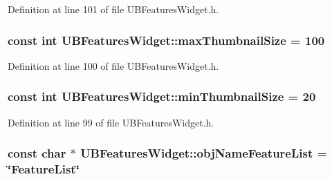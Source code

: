 Definition at line 101 of file U\-B\-Features\-Widget.\-h.

\hypertarget{class_u_b_features_widget_aeaababf494eed37a667f67b4b781014e}{
\subsubsection[{max\-Thumbnail\-Size}]{\setlength{\rightskip}{0pt plus 5cm}const int U\-B\-Features\-Widget\-::max\-Thumbnail\-Size = 100\hspace{0.3cm}{\ttfamily [static]}}}\label{d5/d85/class_u_b_features_widget_aeaababf494eed37a667f67b4b781014e}


Definition at line 100 of file U\-B\-Features\-Widget.\-h.

\hypertarget{class_u_b_features_widget_aea292678d7f53f575fe57cf713aa30a3}{
\subsubsection[{min\-Thumbnail\-Size}]{\setlength{\rightskip}{0pt plus 5cm}const int U\-B\-Features\-Widget\-::min\-Thumbnail\-Size = 20\hspace{0.3cm}{\ttfamily [static]}}}\label{d5/d85/class_u_b_features_widget_aea292678d7f53f575fe57cf713aa30a3}


Definition at line 99 of file U\-B\-Features\-Widget.\-h.

\hypertarget{class_u_b_features_widget_aeb129068ba72a8bbbf17f36064241be0}{
\subsubsection[{obj\-Name\-Feature\-List}]{\setlength{\rightskip}{0pt plus 5cm}const char $\ast$ U\-B\-Features\-Widget\-::obj\-Name\-Feature\-List = \char`\"{}Feature\-List\char`\"{}\hspace{0.3cm}{\ttfamily [static]}}}\label{d5/d85/class_u_b_features_widget_aeb129068ba72a8bbbf17f36064241be0}



